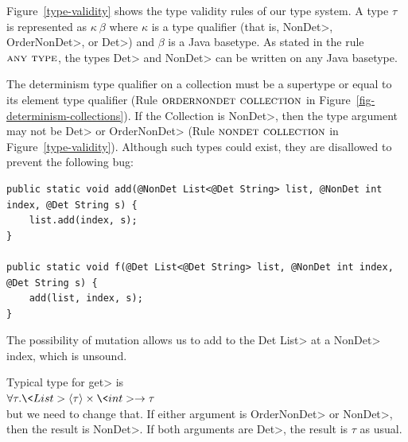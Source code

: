 Figure~\ref{type-validity} shows the type validity
rules of our type system. A type $\tau$ is represented as $\kappa \ \beta$
where $\kappa$ is a type qualifier (that is, \<NonDet>, \<OrderNonDet>, or
\<Det>) and $\beta$ is a Java basetype.
As stated in the rule $\textsc{any type}$, the types \<Det> and \<NonDet>
can be written on any Java basetype.

The determinism type qualifier on a collection must be a supertype or equal to
its element type qualifier (Rule $\textsc{ordernondet collection}$ in Figure~\ref{fig-determinism-collections}).
If the Collection is \<NonDet>, then the type argument may not be
\<Det> or \<OrderNonDet> (Rule $\textsc{nondet collection}$ in Figure~\ref{type-validity}). Although such types could exist, they are
disallowed to prevent the following bug:

\begin{verbatim}
public static void add(@NonDet List<@Det String> list, @NonDet int index, @Det String s) {
    list.add(index, s);
}

public static void f(@Det List<@Det String> list, @NonDet int index, @Det String s) {
    add(list, index, s);
}
\end{verbatim}

The possibility of mutation allows us to add to the \<Det List> at a
\<NonDet> index, which is unsound.

Typical type for \<get> is \\
$\forall \tau . \<List>\angles{\tau} \times \<int> \rightarrow \tau$ \\
but we need to change that.  If either argument is \<OrderNonDet> or \<NonDet>, then the
result is \<NonDet>.
If both arguments are \<Det>, the result is $\tau$ as usual.



